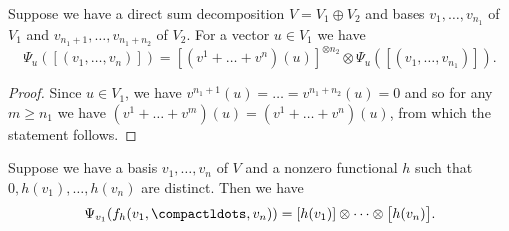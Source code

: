 \documentclass[a4paper]{amsart}
\begin{document}
\begin{lemma}\label{lemma: decomposition} Suppose we have a direct sum decomposition $V=V_1\oplus V_2$ and bases $v_1,\dots, v_{n_1}$  of $V_1$ and $v_{n_1+1},\dots, v_{n_1+n_2}$ of $V_2$.
For a vector $u\in V_1$ we have
\[
\Psi_u([(v_1,\dots,v_n)])=[(v^1+\dots+v^n)(u)]^{\otimes n_2} \otimes \Psi_u([(v_{1},\dots,v_{n_1})]).
\]
\end{lemma}

\begin{proof} 
Since $u\in V_1$, we have $v^{n_1+1}(u)=\dots=v^{n_1+n_2}(u)=0$ and so for any $m\geq n_1$ we have $(v^1+\dots+v^m)(u)=(v^1+\dots+v^n)(u)$, from which the statement follows.
\end{proof}

\begin{lemma} Suppose we have a basis $v_1,\dots,v_n$ of $V$ and a nonzero functional $h$ such that $0,h(v_1),\dots,h(v_n)$ are distinct. Then we have 
\[
\Psi_{v_1}(f_h(v_1,\compactldots,v_n))=[h(v_1)]\otimes \dots \otimes \bigl[h(v_n)\bigr].
\]
\end{lemma}
\end{document}
